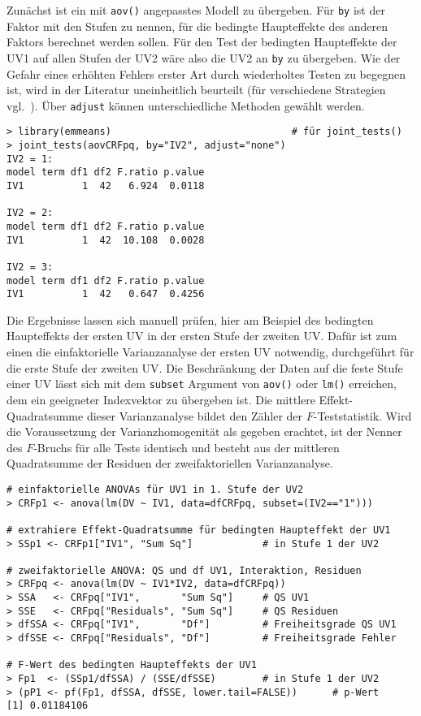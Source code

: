 Zunächst ist ein mit \lstinline!aov()! angepasstes Modell zu übergeben. Für \lstinline!by! ist der Faktor mit den Stufen zu nennen, für die bedingte Haupteffekte des anderen Faktors berechnet werden sollen. Für den Test der bedingten Haupteffekte der UV1 auf allen Stufen der UV2 wäre also die UV2 an \lstinline!by! zu übergeben. Wie der Gefahr eines erhöhten Fehlers erster Art durch wiederholtes Testen zu begegnen ist, wird in der Literatur uneinheitlich beurteilt (für verschiedene Strategien vgl.\ ). Über \lstinline!adjust! können unterschiedliche Methoden gewählt werden.
\begin{lstlisting}
> library(emmeans)                               # für joint_tests()
> joint_tests(aovCRFpq, by="IV2", adjust="none")
IV2 = 1:
model term df1 df2 F.ratio p.value
IV1          1  42   6.924  0.0118

IV2 = 2:
model term df1 df2 F.ratio p.value
IV1          1  42  10.108  0.0028

IV2 = 3:
model term df1 df2 F.ratio p.value
IV1          1  42   0.647  0.4256
\end{lstlisting}

Die Ergebnisse lassen sich manuell prüfen, hier am Beispiel des bedingten Haupteffekts der ersten UV in der ersten Stufe der zweiten UV. Dafür ist zum einen die einfaktorielle Varianzanalyse der ersten UV notwendig, durchgeführt für die erste Stufe der zweiten UV. Die Beschränkung der Daten auf die feste Stufe einer UV lässt sich mit dem \lstinline!subset! Argument von \lstinline!aov()! oder \lstinline!lm()! erreichen, dem ein geeigneter Indexvektor zu übergeben ist. Die mittlere Effekt-Quadratsumme dieser Varianzanalyse bildet den Zähler der $F$-Teststatistik. Wird die Voraussetzung der Varianzhomogenität als gegeben erachtet, ist der Nenner des $F$-Bruchs für alle Tests identisch und besteht aus der mittleren Quadratsumme der Residuen der zweifaktoriellen Varianzanalyse.
\begin{lstlisting}
# einfaktorielle ANOVAs für UV1 in 1. Stufe der UV2
> CRFp1 <- anova(lm(DV ~ IV1, data=dfCRFpq, subset=(IV2=="1")))

# extrahiere Effekt-Quadratsumme für bedingten Haupteffekt der UV1
> SSp1 <- CRFp1["IV1", "Sum Sq"]            # in Stufe 1 der UV2

# zweifaktorielle ANOVA: QS und df UV1, Interaktion, Residuen
> CRFpq <- anova(lm(DV ~ IV1*IV2, data=dfCRFpq))
> SSA   <- CRFpq["IV1",       "Sum Sq"]     # QS UV1
> SSE   <- CRFpq["Residuals", "Sum Sq"]     # QS Residuen
> dfSSA <- CRFpq["IV1",       "Df"]         # Freiheitsgrade QS UV1
> dfSSE <- CRFpq["Residuals", "Df"]         # Freiheitsgrade Fehler

# F-Wert des bedingten Haupteffekts der UV1
> Fp1  <- (SSp1/dfSSA) / (SSE/dfSSE)        # in Stufe 1 der UV2
> (pP1 <- pf(Fp1, dfSSA, dfSSE, lower.tail=FALSE))      # p-Wert
[1] 0.01184106
\end{lstlisting}

